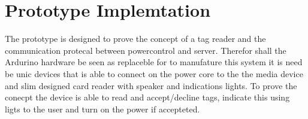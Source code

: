 \section{Prototype Implemtation}
The prototype is designed to prove the concept of a tag reader and the communication protecal between powercontrol and server. Therefor shall the Ardurino hardware be seen as replaceble for to manufature this system it is need be unic devices that is able to connect on the power core to the the media device and slim designed card reader with speaker and indications lights. To prove the conecpt the device is able to read and accept/decline tags, indicate this using ligts to the user and turn on the power if accepteted.   

    